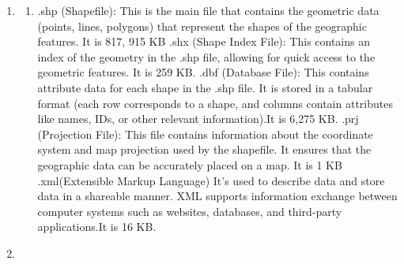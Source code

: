 \documentclass[
  letterpaper,
  DIV=11,
  numbers=noendperiod]{scrartcl}
\providecommand{\tightlist}{%
  \setlength{\itemsep}{0pt}\setlength{\parskip}{0pt}}\usepackage{longtable,booktabs,array}
\begin{document}
\begin{enumerate}
\def\labelenumi{\arabic{enumi}.}
\tightlist
\item
  \begin{enumerate}
  \def\labelenumii{\alph{enumii}.}
  \tightlist
  \item
    .shp (Shapefile): This is the main file that contains the geometric
    data (points, lines, polygons) that represent the shapes of the
    geographic features. It is 817, 915 KB .shx (Shape Index File): This
    contains an index of the geometry in the .shp file, allowing for
    quick access to the geometric features. It is 259 KB. .dbf (Database
    File): This contains attribute data for each shape in the .shp file.
    It is stored in a tabular format (each row corresponds to a shape,
    and columns contain attributes like names, IDs, or other relevant
    information).It is 6,275 KB. .prj (Projection File): This file
    contains information about the coordinate system and map projection
    used by the shapefile. It ensures that the geographic data can be
    accurately placed on a map. It is 1 KB .xml(Extensible Markup
    Language) It's used to describe data and store data in a shareable
    manner. XML supports information exchange between computer systems
    such as websites, databases, and third-party applications.It is 16
    KB.
  \end{enumerate}
\item
\end{enumerate}
\end{document}
